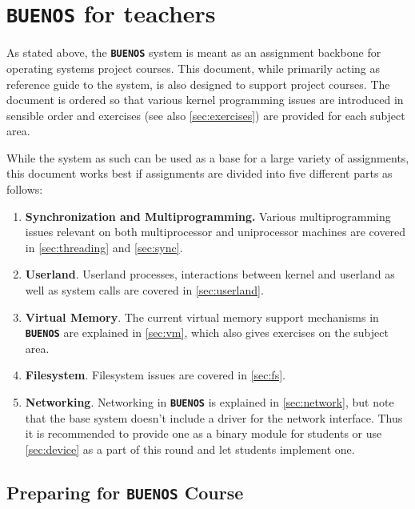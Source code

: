 \documentclass[twoside,a4paper]{report}
\newcommand{\buenos}{\texttt{\textbf{BUENOS}}}
\begin{document}
\section{\buenos{} for teachers}

As stated above, the \buenos{} system is meant as an assignment
backbone for operating systems project courses. This document, while
primarily acting as reference guide to the system, is also designed to
support project courses. The document is ordered so that various
kernel programming issues are introduced in sensible order and
exercises (see also \autoref{sec:exercises}) are provided for
each subject area.

While the system as such can be used as a base for a large variety of
assignments, this document works best if assignments are
divided into five different parts as follows:

\begin{enumerate}

\item \textbf{Synchronization and Multiprogramming.} Various
multiprogramming issues relevant on both multiprocessor and
uniprocessor machines are covered in \autoref{sec:threading} and
\autoref{sec:sync}.

\item \textbf{Userland}. Userland processes, interactions between
kernel and userland as well as system calls are covered in
\autoref{sec:userland}.

\item \textbf{Virtual Memory}. The current virtual memory support
mechanisms in \buenos{} are explained in \autoref{sec:vm}, which also
gives exercises on the subject area.

\item \textbf{Filesystem}. Filesystem issues are covered in
\autoref{sec:fs}.

\item \textbf{Networking}. Networking in \buenos{} is explained in
\autoref{sec:network}, but note that the base system doesn't include a
driver for the network interface. Thus it is recommended to provide
one as a binary module for students or use \autoref{sec:device} as
a part of this round and let students implement one.

\end{enumerate}

\subsection{Preparing for \buenos{} Course}
\end{document}
